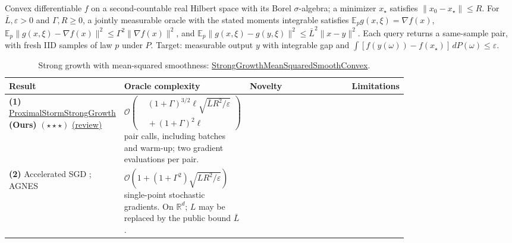 \begin{table}[tp]
\centering
\caption{Strong growth with mean-squared smoothness: \href{https://github.com/k3nfalt/longtails/blob/main/LongTails/Setups/StrongGrowthMeanSquaredSmoothConvex.lean}{StrongGrowthMeanSquaredSmoothConvex}.}\label{tab:StrongGrowthMeanSquaredSmoothConvex}
\parbox{\linewidth}{\footnotesize Convex differentiable $f$ on a second-countable real Hilbert space with its Borel $\sigma$-algebra; a minimizer $x_\star$ satisfies $\|x_0-x_\star\|\le R$. For $\bar L,\varepsilon>0$ and $\Gamma,R\ge0$, a jointly measurable oracle with the stated moments integrable satisfies $\mathbb E_p g(x,\xi)=\nabla f(x)$, $\mathbb E_p\|g(x,\xi)-\nabla f(x)\|^2\le\Gamma^2\|\nabla f(x)\|^2$, and $\mathbb E_p\|g(x,\xi)-g(y,\xi)\|^2\le\bar L^2\|x-y\|^2$. Each query returns a same-sample pair, with fresh IID samples of law $p$ under $P$. Target: measurable output $y$ with integrable gap and $\int [f(y(\omega))-f(x_\star)]\,dP(\omega)\le\varepsilon$.}\par\smallskip
\begin{threeparttable}
\footnotesize
\setlength{\tabcolsep}{4pt}\renewcommand{\arraystretch}{1.25}
\begin{tabularx}{\linewidth}{@{}>{\raggedright\arraybackslash}p{0.20\linewidth}>{\raggedright\arraybackslash}p{0.30\linewidth}>{\raggedright\arraybackslash}p{0.28\linewidth}>{\raggedright\arraybackslash}X@{}}
\toprule
\textbf{Result} & \textbf{Oracle complexity} & \textbf{Novelty} & \textbf{Limitations} \\
\midrule
\textbf{(1)} \href{https://github.com/k3nfalt/longtails/blob/main/LongTails/Theorems/ProximalStormStrongGrowth.lean}{Proximal\allowbreak Storm\allowbreak Strong\allowbreak Growth} \textbf{(Ours)} $(\star\star\star)$ \href{https://github.com/k3nfalt/longtails/blob/main/scripts/reviews/ProximalStormStrongGrowth.md}{(review)}
& $\displaystyle\mathcal{O}\!\left(\begin{aligned}&(1+\Gamma)^{3/2}\ell\sqrt{\bar L R^2/\varepsilon}\\&{}+(1+\Gamma)^2\ell\end{aligned}\right)$ pair calls, including batches and warm-up; two gradient evaluations per pair.
& & \\
\midrule[1.2pt]
\textbf{(2)} Accelerated SGD \citep[Thm.~2]{gssgVaswani2019}; AGNES \citep[Thm.~3]{sgmssGupta2024v3}
& $\displaystyle\mathcal{O}\!\left(1+(1+\Gamma^2)\sqrt{LR^2/\varepsilon}\right)$ single-point stochastic gradients. On $\mathbb R^d$; $L$ may be replaced by the public bound $\bar L$.

\end{tabularx}
\end{threeparttable}
\end{table}
